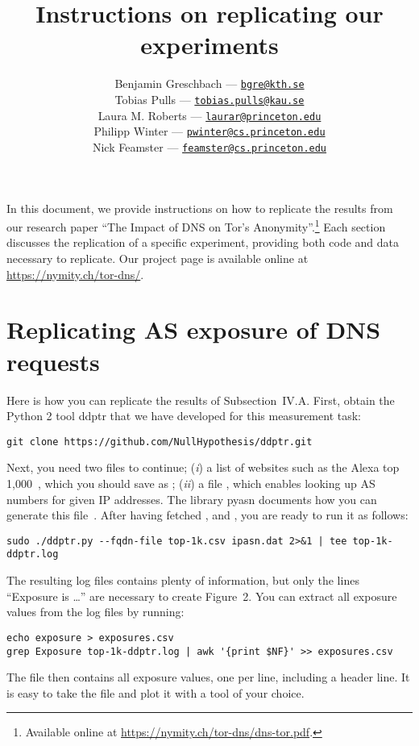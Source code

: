 \documentclass{article}
\title{Instructions on replicating our experiments}
\author{%
	Benjamin Greschbach --- \href{mailto:bgre@kth.se}{\nolinkurl{bgre@kth.se}} \\
	Tobias Pulls --- \href{mailto:tobias.pulls@kau.se}{\nolinkurl{tobias.pulls@kau.se}} \\
	Laura M. Roberts --- \href{mailto:laurar@princeton.edu}{\nolinkurl{laurar@princeton.edu}} \\
	Philipp Winter --- \href{mailto:pwinter@cs.princeton.edu}{\nolinkurl{pwinter@cs.princeton.edu}} \\
	Nick Feamster --- \href{mailto:feamster@cs.princeton.edu}{\nolinkurl{feamster@cs.princeton.edu}}
}
\newcommand{\first}{(\emph{i})\xspace}
\newcommand{\second}{(\emph{ii})\xspace}
\begin{document}
\maketitle

In this document, we provide instructions on how to replicate the results from
our research paper ``The Impact of DNS on Tor's Anonymity''.\footnote{Available
online at \url{https://nymity.ch/tor-dns/dns-tor.pdf}.} Each section discusses
the replication of a specific experiment, providing both code and data necessary
to replicate.  Our project page is available online at
\url{https://nymity.ch/tor-dns/}.

\tableofcontents

\newpage

\section{Replicating AS exposure of DNS requests}
Here is how you can replicate the results of Subsection~IV.A.  First, obtain the
Python 2 tool ddptr that we have developed for this measurement task:

\begin{lstlisting}
git clone https://github.com/NullHypothesis/ddptr.git
\end{lstlisting}

Next, you need two files to continue; \first a list of websites such as the
Alexa top 1,000~\cite{alexatop1k}, which you should save as ;
\second a file , which enables looking up AS numbers for given IP
addresses.  The library pyasn documents how you can generate this
file~\cite{pyasn}.  After having fetched ,  and
, you are ready to run it as follows:

\begin{lstlisting}
sudo ./ddptr.py --fqdn-file top-1k.csv ipasn.dat 2>&1 | tee top-1k-ddptr.log
\end{lstlisting}

The resulting log files contains plenty of information, but only the lines
``Exposure is \ldots'' are necessary to create Figure~2.  You can extract all
exposure values from the log files by running:

\begin{lstlisting}
echo exposure > exposures.csv
grep Exposure top-1k-ddptr.log | awk '{print $NF}' >> exposures.csv
\end{lstlisting}

The file  then contains all exposure values, one per line,
including a header line.  It is easy to take the file and plot it with a tool of
your choice.
\end{document}
